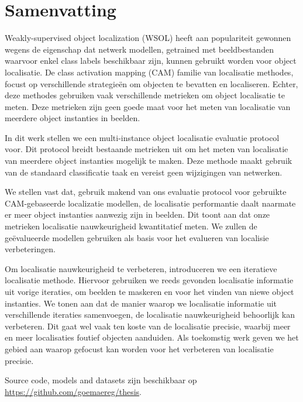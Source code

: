 \chapter*{Samenvatting}

Weakly-supervised object localization (WSOL) heeft aan populariteit gewonnen wegens de eigenschap dat netwerk modellen, getrained met beeldbestanden waarvoor enkel class labels beschikbaar zijn, kunnen gebruikt worden voor object localisatie. De class activation mapping (CAM) familie van localisatie methodes, focust op verschillende strategieën om objecten te bevatten en localiseren. Echter, deze methodes gebruiken vaak verschillende metrieken om object localisatie te meten. Deze metrieken zijn geen goede maat voor het meten van localisatie van  meerdere object instanties in beelden.

In dit werk stellen we een multi-instance object localisatie evaluatie protocol voor. Dit protocol breidt bestaande metrieken uit om het meten van localisatie van meerdere object instanties mogelijk te maken. Deze methode maakt gebruik van de standaard classificatie taak en vereist geen wijzigingen van netwerken.

We stellen vast dat, gebruik makend van ons evaluatie protocol voor gebruikte CAM-gebaseerde localizatie modellen, de localisatie performantie daalt naarmate er meer object instanties aanwezig zijn in beelden. Dit toont aan dat onze metrieken localisatie nauwkeurigheid kwantitatief meten. We zullen de geëvalueerde modellen gebruiken als basis voor het evalueren van localisie verbeteringen.

Om localisatie nauwkeurigheid te verbeteren, introduceren we een iteratieve localisatie methode. Hiervoor gebruiken we reeds gevonden localisatie informatie uit vorige iteraties, om beelden te maskeren en voor het vinden van niewe object instanties. We tonen aan dat de manier waarop we localisatie informatie uit verschillende iteraties samenvoegen, de localisatie nauwkeurigheid behoorlijk kan verbeteren. Dit gaat wel vaak ten koste van de localisatie precisie, waarbij meer en meer localisaties foutief objecten aanduiden. Als toekomstig werk geven we het gebied aan waarop gefocust kan worden voor het verbeteren van localisatie precisie.

Source code, models and datasets zijn beschikbaar op \url{https://github.com/goemaereg/thesis}.